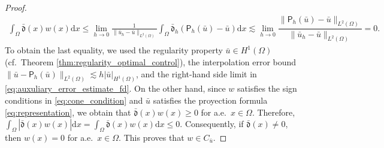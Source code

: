 \documentclass[final]{siamart0216}
\begin{document}
\begin{proof}
\begin{eqnarray*}
\int_{\Omega}\bar{\mathfrak{d}}(x)w(x)\mathrm{d}x
\leq
\lim_{h \rightarrow 0}
\frac{1}{\|\bar{u}_h-\bar{u}\|_{L^2(\Omega)}}
 \int_{\Omega}\bar{\mathfrak{d}}_h(\mathsf{P}_h(\bar{u})-\bar{u})\mathrm{d}x
\lesssim \lim_{h \rightarrow 0}\dfrac{\|\mathsf{P}_h(\bar{u})-\bar{u}\|_{L^2(\Omega)}}{\|\bar{u}_h-\bar{u}\|_{L^2(\Omega)}}=0.
\end{eqnarray*}
To obtain the last equality, we used the regularity property $\bar{u} \in H^1(\Omega)$ (cf.~Theorem \ref{thm:regularity_optimal_control}), the interpolation error bound $\| \bar{u} - \mathsf{P}_h(\bar{u}) \|_{L^2(\Omega)} \lesssim h | \bar{u} |_{H^1(\Omega)}$, and the right-hand side limit in \eqref{eq:auxuliary_error_estimate_fd}. On the other hand, since $w$ satisfies the sign conditions in \eqref{eq:cone_condition} and $\bar u$ satisfies the proyection formula \eqref{eq:representation}, we obtain that $\bar{\mathfrak{d}}(x)w(x)\geq 0$ for a.e.~$x\in\Omega$. Therefore, $\int_{\Omega}|\bar{\mathfrak{d}}(x)w(x)|\mathrm{d}x = \int_{\Omega}\bar{\mathfrak{d}}(x)w(x)\mathrm{d}x \leq 0$. Consequently, if $\bar{\mathfrak{d}}(x)\neq 0$, then $w(x)=0$ for a.e.~$x\in\Omega$. This proves that $w\in C_{\bar{u}}$.


\end{proof}
\end{document}
